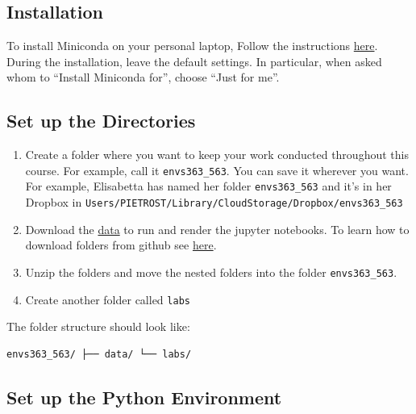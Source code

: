 \documentclass[
  letterpaper,
  DIV=11,
  numbers=noendperiod]{scrreprt}
\providecommand{\tightlist}{%
  \setlength{\itemsep}{0pt}\setlength{\parskip}{0pt}}\usepackage{longtable,booktabs,array}
\begin{document}

\subsection*{Installation}\label{installation-1}

To install Miniconda on your personal laptop, Follow the instructions
\href{https://docs.conda.io/projects/miniconda/en/latest/miniconda-install.html}{here}.
During the installation, leave the default settings. In particular, when
asked whom to ``Install Miniconda for'', choose ``Just for me''.

\subsection*{Set up the Directories}\label{set-up-the-directories-1}

\begin{enumerate}
\def\labelenumi{\arabic{enumi}.}
\tightlist
\item
  Create a folder where you want to keep your work conducted throughout
  this course. For example, call it \texttt{envs363\_563}. You can save
  it wherever you want. For example, Elisabetta has named her folder
  \texttt{envs363\_563} and it's in her Dropbox in
  \texttt{Users/PIETROST/Library/CloudStorage/Dropbox/envs363\_563}
\item
  Download the
  \href{https://github.com/pietrostefani/gds/tree/main/data}{data} to
  run and render the jupyter notebooks. To learn how to download folders
  from github see
  \href{https://pietrostefani.github.io/gds/download.html}{here}.
\item
  Unzip the folders and move the nested folders into the folder
  \texttt{envs363\_563}.
\item
  Create another folder called \texttt{labs}
\end{enumerate}

The folder structure should look like:

\begin{verbatim}
envs363_563/ ├── data/ └── labs/
\end{verbatim}

\subsection*{Set up the Python
Environment}\label{set-up-the-python-environment-1}
\end{document}
